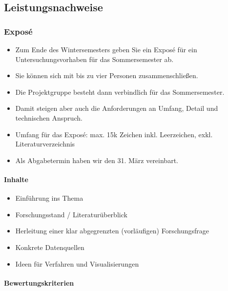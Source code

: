 \documentclass[11pt,german,a4paper]{article}
\providecommand{\tightlist}{%
  \setlength{\itemsep}{0pt}\setlength{\parskip}{0pt}}
\let\oldparagraph\paragraph
\renewcommand{\paragraph}[1]{\oldparagraph{#1}\mbox{}}
\begin{document}
\hypertarget{leistungsnachweise}{%
\subsection{Leistungsnachweise}\label{leistungsnachweise}}

\hypertarget{exposuxe9}{%
\subsubsection{Exposé}\label{exposuxe9}}

\begin{itemize}
\tightlist
\item
  Zum Ende des Wintersemesters geben Sie ein Exposé für ein Untersuchungsvorhaben für das Sommersemester ab.
\item
  Sie können sich mit bis zu vier Personen zusammenschließen.
\item
  Die Projektgruppe besteht dann verbindlich für das Sommersemester.
\item
  Damit steigen aber auch die Anforderungen an Umfang, Detail und technischen Anspruch.
\item
  Umfang für das Exposé: max. 15k Zeichen inkl. Leerzeichen, exkl. Literaturverzeichnis
\item
  Als Abgabetermin haben wir den 31. März vereinbart.
\end{itemize}

\hypertarget{inhalte}{%
\paragraph{Inhalte}\label{inhalte}}

\begin{itemize}
\tightlist
\item
  Einführung ins Thema
\item
  Forschungsstand / Literaturüberblick
\item
  Herleitung einer klar abgegrenzten (vorläufigen) Forschungsfrage
\item
  Konkrete Datenquellen
\item
  Ideen für Verfahren und Visualisierungen
\end{itemize}

\hypertarget{bewertungskriterien}{%
\paragraph{Bewertungskriterien}\label{bewertungskriterien}}
\end{document}
